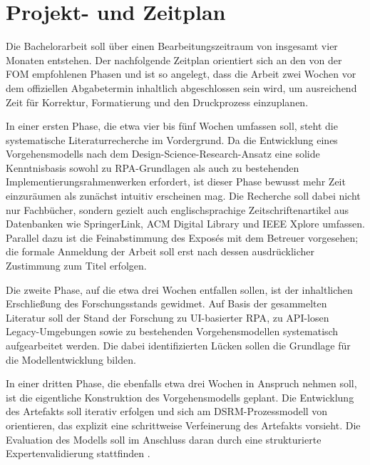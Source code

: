 \newpage
\section{Projekt- und Zeitplan}

Die Bachelorarbeit soll über einen Bearbeitungszeitraum von insgesamt vier Monaten entstehen. 
Der nachfolgende Zeitplan orientiert sich an den von der FOM empfohlenen Phasen und ist so 
angelegt, dass die Arbeit zwei Wochen vor dem offiziellen Abgabetermin inhaltlich 
abgeschlossen sein wird, um ausreichend Zeit für Korrektur, Formatierung und den 
Druckprozess einzuplanen.

In einer ersten Phase, die etwa vier bis fünf Wochen umfassen soll, steht die systematische 
Literaturrecherche im Vordergrund. Da die Entwicklung eines Vorgehensmodells nach dem 
Design-Science-Research-Ansatz \autocite[Vgl.][S.~75]{Hevner2004}\autocite[Vgl.][S.~45]{Peffers2007} eine solide 
Kenntnisbasis sowohl zu \acs{RPA}-Grundlagen \autocite[Vgl.][S.~269]{VanDerAalst2018}\autocite[Vgl.][S.~1]{Feldmann2022}\autocite[Vgl.][S.~3]{CzarneckiFettke2021} 
als auch zu bestehenden Implementierungsrahmenwerken \autocite[Vgl.][S.~3]{HermJaniesch2022}\autocite[Vgl.][S.~5]{KrakauFeldmann2023} 
erfordert, ist dieser Phase bewusst mehr Zeit einzuräumen als zunächst intuitiv erscheinen 
mag. Die Recherche soll dabei nicht nur Fachbücher, sondern gezielt auch englischsprachige 
Zeitschriftenartikel aus Datenbanken wie SpringerLink, \acs{ACM} Digital Library und \acs{IEEE} Xplore 
umfassen. Parallel dazu ist die Feinabstimmung des Exposés mit dem Betreuer vorgesehen; 
die formale Anmeldung der Arbeit soll erst nach dessen ausdrücklicher Zustimmung zum Titel 
erfolgen.

Die zweite Phase, auf die etwa drei Wochen entfallen sollen, ist der inhaltlichen 
Erschließung des Forschungsstands gewidmet. Auf Basis der gesammelten Literatur soll 
der Stand der Forschung zu \acs{UI}-basierter \ac{RPA}, zu \acs{API}-losen Legacy-Umgebungen sowie zu 
bestehenden Vorgehensmodellen systematisch aufgearbeitet werden. \autocite[Vgl.][S.~1]{Wewerka2023}
Die dabei identifizierten Lücken sollen die Grundlage für die Modellentwicklung bilden.

In einer dritten Phase, die ebenfalls etwa drei Wochen in Anspruch nehmen soll, ist die 
eigentliche Konstruktion des Vorgehensmodells geplant. Die Entwicklung des Artefakts 
soll iterativ erfolgen und sich am \acs{DSRM}-Prozessmodell von \textcite{Peffers2007} 
orientieren, das explizit eine schrittweise Verfeinerung des Artefakts vorsieht. Die 
Evaluation des Modells soll im Anschluss daran durch eine strukturierte 
Expertenvalidierung stattfinden \autocite[Vgl.][S.~77]{VenableEtAl2016}.

